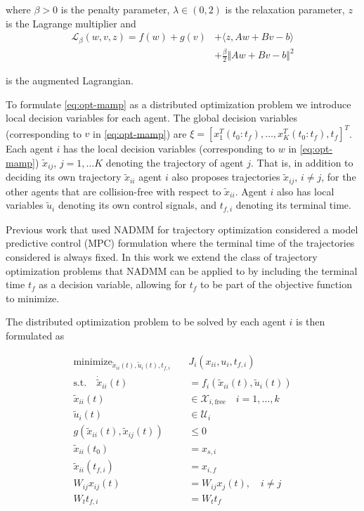 \documentclass[letterpaper, 10 pt, conference]{ieeeconf}  %
\DeclareMathOperator*{\minimize}{minimize}
\begin{document}
\noindent where $\beta > 0$ is the penalty parameter, $\lambda \in (0, 2)$ is the relaxation parameter, $z$ is the Lagrange multiplier and 
\begin{equation}
\begin{aligned}
\mathcal{L}_\beta(w, v, z) = f(w) + g(v) &+ \langle z, Aw + Bv - b \rangle
\\ &+ \frac{\beta}{2} \Vert Aw + Bv - b \Vert^2
\end{aligned}
\end{equation}

\noindent is the augmented Lagrangian.

To formulate \eqref{eq:opt-mamp} as a distributed optimization problem we introduce local decision variables for each agent. The global decision variables (corresponding to $v$ in \eqref{eq:opt-mamp}) are $\xi = [x_1^T(t_0:t_f), \dots, x_K^T(t_0:t_f), t_f]^T$. Each agent $i$ has the local decision variables (corresponding to $w$ in \eqref{eq:opt-mamp}) $\tilde{x}_{ij}$, $j=1, \dots K$ denoting the trajectory of agent $j$. That is, in addition to deciding its own trajectory $\tilde{x}_{ii}$ agent $i$ also proposes trajectories $\tilde{x}_{ij}$, $i \neq j$, for the other agents that are collision-free with respect to $\tilde{x}_{ii}$. Agent $i$ also has local variables $\tilde{u}_i$ denoting its own control signals, and $t_{f, i}$ denoting its terminal time. 

Previous work that used NADMM for trajectory optimization \cite{ferranti2022distributed, tran2024parallel} considered a model predictive control (MPC) formulation where the terminal time of the trajectories considered is always fixed. In this work we extend the class of trajectory optimization problems that NADMM can be applied to by including the terminal time $t_f$ as a decision variable, allowing for $t_f$ to be part of the objective function to minimize.

The distributed optimization problem to be solved by each agent $i$ is then formulated as

\begin{subequations}
\label{eq:dist-opt}
\begin{align}
\minimize_{\tilde{x}_{ii}(t), \tilde{u}_{i}(t), t_{f, i}} \quad &  J_i(x_{ii}, u_{i}, t_{f, i}) \\
\text{s.t.} \quad \dot{\tilde{x}}_{ii}(t) & = f_i(\tilde{x}_{ii}(t), \tilde{u}_{i}(t)) \\
\tilde{x}_{ii}(t) & \in \mathcal{X}_{i, \text{free}} \quad i = 1, \dots, k \\
\tilde{u}_{i}(t) & \in \mathcal{U}_i \\
g(\tilde{x}_{ii}(t), \tilde{x}_{ij}(t)) & \leq 0 \\ 
 \tilde{x}_{ii}(t_0) & = x_{s, i} \\ 
 \tilde{x}_{ii}(t_{f, i}) & = x_{i, f} \\
 W_{ij}x_{ij}(t) &= W_{ij}x_j(t), \quad i \neq j \\
 W_t t_{f, i} &= W_t t_f 
\end{align}
\end{subequations}
\end{document}

